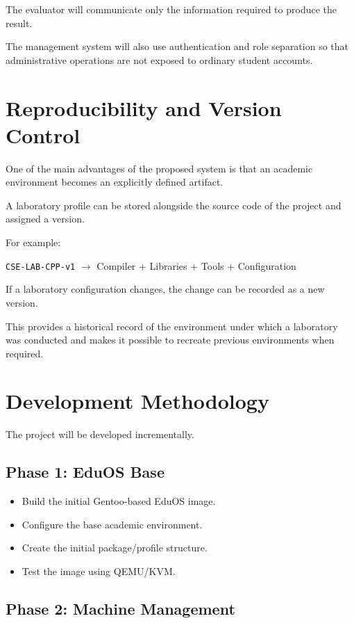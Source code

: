 \documentclass[12pt,a4paper]{article}
\begin{document}
The evaluator will communicate only the information required to produce the result.

The management system will also use authentication and role separation so that administrative operations are not exposed to ordinary student accounts.

\section{Reproducibility and Version Control}

One of the main advantages of the proposed system is that an academic environment becomes an explicitly defined artifact.

A laboratory profile can be stored alongside the source code of the project and assigned a version.

For example:

\begin{center}
\texttt{CSE-LAB-CPP-v1}
$\rightarrow$
Compiler + Libraries + Tools + Configuration
\end{center}

If a laboratory configuration changes, the change can be recorded as a new version.

This provides a historical record of the environment under which a laboratory was conducted and makes it possible to recreate previous environments when required.

\section{Development Methodology}

The project will be developed incrementally.

\subsection{Phase 1: EduOS Base}

\begin{itemize}
    \item Build the initial Gentoo-based EduOS image.
    \item Configure the base academic environment.
    \item Create the initial package/profile structure.
    \item Test the image using QEMU/KVM.
\end{itemize}

\subsection{Phase 2: Machine Management}
\end{document}
